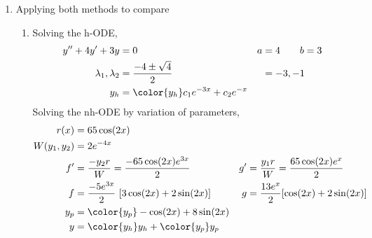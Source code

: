 \begin{enumerate}
    \item Applying both methods to compare
          \begin{enumerate}
              \item Solving the h-ODE,
                    \begin{align}
                        y''  + 4y' + 3y          & = 0                         &
                        a                        & = 4 \qquad b = 3              \\
                        \lambda_{1}, \lambda_{2} & = \frac{-4 \pm \sqrt{4}}{2} &
                                                 & = -3, -1                      \\
                        y_{h}                    & = {\color{y_h} c_{1}e^{-3x}
                        + c_{2}e^{-x}}
                    \end{align}
                    Solving the nh-ODE by variation of parameters,
                    \begin{align}
                        r(x)            & = 65\cos(2x)                                \\
                        W(y_{1}, y_{2}) & = 2e^{-4x}                                  \\
                        f'              & = \frac{-y_{2}r}{W} = \frac{-65\cos(2x)
                        e^{3x}}{2}      &
                        g'              & = \frac{y_{1}r}{W} = \frac{65\cos(2x)
                        e^{x}}{2}                                                     \\
                        f               & = \frac{-5e^{3x}}{2}\ [3\cos(2x)
                        + 2\sin(2x)]    &
                        g               & = \frac{13e^{x}}{2} [\cos(2x) + 2\sin(2x)]  \\
                        y_{p}           & = {\color{y_p} -\cos(2x) + 8\sin(2x)}       \\
                        y               & = {\color{y_h} y_{h}} + {\color{y_p} y_{p}}
                    \end{align}


\end{enumerate}
\end{enumerate}
